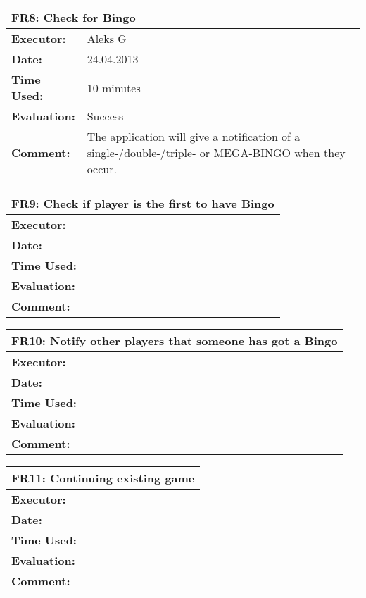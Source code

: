 \begin{tabular}{|m{}||m{}|}
\hline
\multicolumn{2}{|l|}{FR8: Check for Bingo} \\ \hline
\textbf{Executor:} & Aleks G \\ \hline
\textbf{Date:} & 24.04.2013\\ \hline
\textbf{Time Used:} & 10 minutes \\ \hline
\textbf{Evaluation:} & Success\\ \hline
\textbf{Comment:} & The application will give a notification of a single-/double-/triple- or MEGA-BINGO when they occur.\\ \hline
\end{tabular}

\begin{tabular}{|m{}||m{}|}
\hline
\multicolumn{2}{|l|}{FR9: Check if player is the first to have Bingo} \\ \hline
\textbf{Executor:} & \\ \hline
\textbf{Date:} & \\ \hline
\textbf{Time Used:} & \\ \hline
\textbf{Evaluation:} & \\ \hline
\textbf{Comment:} & \\ \hline
\end{tabular}

\begin{tabular}{|m{}||m{}|}
\hline
\multicolumn{2}{|l|}{FR10: Notify other players that someone has got a Bingo} \\ \hline
\textbf{Executor:} & \\ \hline
\textbf{Date:} & \\ \hline
\textbf{Time Used:} & \\ \hline
\textbf{Evaluation:} & \\ \hline
\textbf{Comment:} & \\ \hline
\end{tabular}


\begin{tabular}{|m{}||m{}|}
\hline
\multicolumn{2}{|l|}{FR11: Continuing existing game} \\ \hline
\textbf{Executor:} & \\ \hline
\textbf{Date:} & \\ \hline
\textbf{Time Used:} & \\ \hline
\textbf{Evaluation:} & \\ \hline
\textbf{Comment:} & \\ \hline
\end{tabular}

